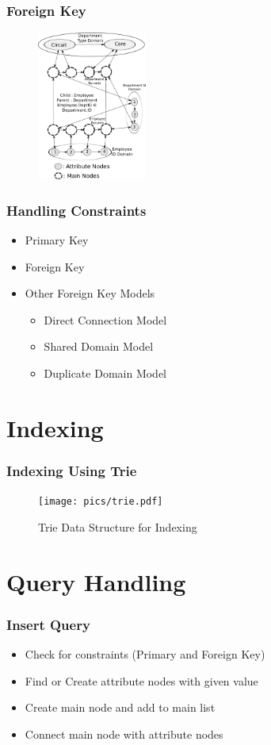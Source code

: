 \documentclass[14pt,xcolor=dvipsnames, aspectratio=169]{beamer}
\begin{document}
\begin{frame}
 \frametitle{Foreign Key}
 \begin{figure}[h]
 \centering
 \includegraphics[width=0.32\textwidth]{pics/foreign_key.pdf}
\end{figure}
\end{frame}

\begin{frame}
 \frametitle{Handling Constraints}
 \begin{itemize}
  \item Primary Key
  \item Foreign Key
  \item Other Foreign Key Models
  \begin{itemize}
    \item<2-> Direct Connection Model
    \item<3-> Shared Domain Model
    \item<4-> Duplicate Domain Model
  \end{itemize}
 \end{itemize}
\end{frame}
 
\section{Indexing}
\begin{frame}
 \frametitle{Indexing Using Trie}
 \begin{figure}
 \centering
 \texttt{[image: pics/trie.pdf]}
 \caption{Trie Data Structure for Indexing}
 \end{figure}
\end{frame}

\section{Query Handling}
\begin{frame}
\frametitle{Insert Query}
\begin{itemize}
 \item<1-> Check for constraints (Primary and Foreign Key)
 \item<2-> Find or Create attribute nodes with given value
 \item<3-> Create main node and add to main list
 \item<4-> Connect main node with attribute nodes
\end{itemize}
\end{frame}
\end{document}
